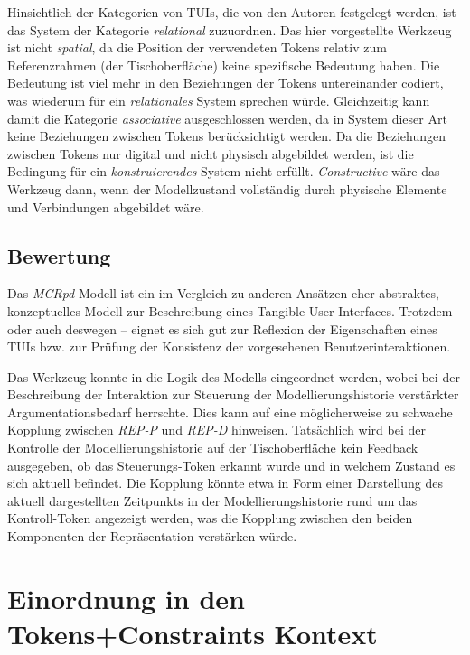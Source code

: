Hinsichtlich der Kategorien von \glspl{TUI}, die von den Autoren festgelegt werden, ist das System der Kategorie \emph{relational} zuzuordnen. Das hier vorgestellte Werkzeug ist nicht \emph{spatial}, da die Position der verwendeten Tokens relativ zum Referenzrahmen (der Tischoberfläche) keine spezifische Bedeutung haben. Die Bedeutung ist viel mehr in den Beziehungen der Tokens untereinander codiert, was wiederum für ein \emph{relationales} System sprechen würde. Gleichzeitig kann damit die Kategorie \emph{associative} ausgeschlossen werden, da in System dieser Art keine Beziehungen zwischen Tokens berücksichtigt werden. Da die Beziehungen zwischen Tokens nur digital und nicht physisch abgebildet werden, ist die Bedingung für ein \emph{konstruierendes} System nicht erfüllt. \emph{Constructive} wäre das Werkzeug dann, wenn der Modellzustand vollständig durch physische Elemente und Verbindungen abgebildet wäre.

\subsection{Bewertung}

Das \emph{MCRpd}-Modell ist ein im Vergleich zu anderen Ansätzen eher abstraktes, konzeptuelles Modell zur Beschreibung eines Tangible User Interfaces. Trotzdem -- oder auch deswegen -- eignet es sich gut zur Reflexion der Eigenschaften eines \glspl{TUI} bzw. zur Prüfung der Konsistenz der vorgesehenen Benutzerinteraktionen.

Das Werkzeug konnte in die Logik des Modells eingeordnet werden, wobei bei der Beschreibung der Interaktion zur Steuerung der Modellierungshistorie verstärkter Argumentationsbedarf herrschte. Dies kann auf eine möglicherweise zu schwache Kopplung zwischen \emph{REP-P} und \emph{REP-D} hinweisen. Tatsächlich wird bei der Kontrolle der Modellierungshistorie auf der Tischoberfläche kein Feedback ausgegeben, ob das Steuerungs-Token erkannt wurde und in welchem Zustand es sich aktuell befindet. Die Kopplung könnte etwa in Form einer Darstellung des aktuell dargestellten Zeitpunkts in der Modellierungshistorie rund um das Kontroll-Token angezeigt werden, was die Kopplung zwischen den beiden Komponenten der Repräsentation verstärken würde.


\section{Einordnung in den Tokens+Constraints Kontext} %
\label{sec:einordnung_in_den_tokens_constraints_kontext}

